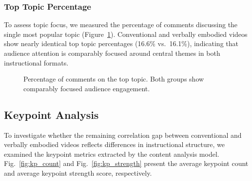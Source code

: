 \subsubsection{Top Topic Percentage}
To assess topic focus, we measured the percentage of comments discussing the single most popular topic (Figure~\ref{fig:yt_top}). Conventional and verbally embodied videos show nearly identical top topic percentages (16.6\% vs.\ 16.1\%), indicating that audience attention is comparably focused around central themes in both instructional formats.

\begin{figure}[h!]
    \centering
    \caption{Percentage of comments on the top topic. Both groups show comparably focused audience engagement.}
    \label{fig:yt_top}
\end{figure}


\subsection{Keypoint Analysis}

To investigate whether the remaining correlation gap between conventional and verbally embodied videos reflects differences in instructional structure, we examined the keypoint metrics extracted by the content analysis model. Fig.~\ref{fig:kp_count} and Fig.~\ref{fig:kp_strength} present the average keypoint count and average keypoint strength score, respectively.

